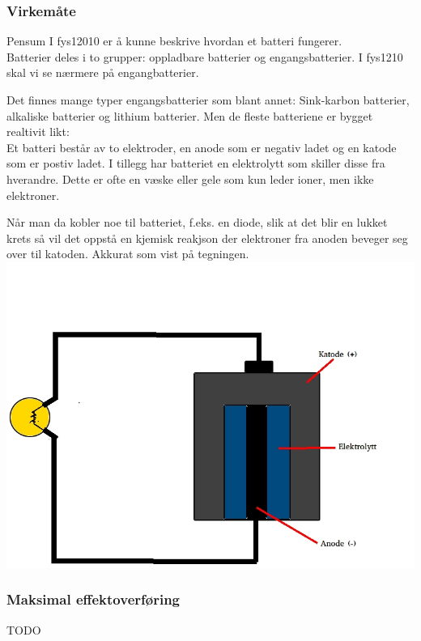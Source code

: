 \subsubsection{Virkemåte}
Pensum I fys12010 er å kunne beskrive hvordan et batteri fungerer.
\\

Batterier deles i to grupper: oppladbare batterier og engangsbatterier.
I fys1210 skal vi se nærmere på engangbatterier.

Det finnes mange typer engangsbatterier som blant annet:
Sink-karbon batterier, alkaliske batterier og lithium batterier.
Men de fleste batteriene er bygget realtivit likt:
\\

Et batteri består av to elektroder,
en anode som er negativ ladet og en katode som er postiv ladet.
I tillegg har batteriet en elektrolytt som skiller disse fra hverandre.
Dette er ofte en væske eller gele som kun leder ioner, men ikke elektroner.

Når man da kobler noe til batteriet, f.eks. en diode,
slik at det blir en lukket krets
så vil det oppstå en kjemisk reakjson
der elektroner fra anoden beveger seg over til katoden.
Akkurat som vist på tegningen.
\\
\includegraphics[width=\textwidth]{./img/batteri}

\subsubsection{Maksimal effektoverføring}
TODO
